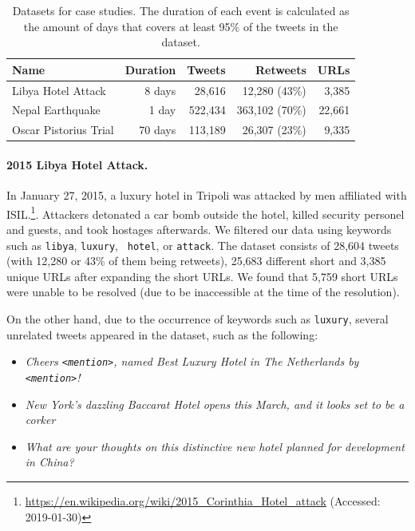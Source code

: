 \begin{table}[h]
  \centering
  \begin{tabular}{@{}lrrrr@{}}
  \toprule
  Name                  & Duration & Tweets & Retweets & URLs  \\ \midrule
  Libya Hotel Attack    & 8 days   & 28,616 & 12,280 (43\%)  & 3,385            \\
  Nepal Earthquake      & 1 day   & 522,434 & 363,102 (70\%) & 22,661          \\ 
  Oscar Pistorius Trial & 70 days  & 113,189 & 26,307 (23\%)  & 9,335           \\ \bottomrule
  \end{tabular}
  \caption[Datasets for case studies.]{Datasets for case studies. The duration of each event is calculated as the amount of days that covers at least 95\% of the tweets in the dataset.}
  \label{tab:datasets}
\end{table}


\paragraph{2015 Libya Hotel Attack.} 
%
In January 27, 2015, a luxury hotel in Tripoli was attacked by men affiliated
with
ISIL.\footnote{\url{https://en.wikipedia.org/wiki/2015_Corinthia_Hotel_attack}
(Accessed: 2019-01-30)}. 
%
Attackers detonated a car bomb outside the hotel, killed security personel and
guests, and took hostages afterwards. 
%
We filtered our data using keywords such as {\tt libya}, {\tt luxury}, {\tt
hotel}, or {\tt attack}. 
The dataset consists of 28,604 tweets (with 12,280 or 43\% of them being
retweets), 25,683 different short and 3,385 unique URLs after expanding the
short URLs. 
%
We found that 5,759 short URLs were unable to be resolved (due to be
inaccessible at the time of the resolution).

On the other hand, due to the occurrence of keywords such as {\tt luxury},
several unrelated tweets appeared in the dataset, such as the following:

\begin{itemize}
\item {\it Cheers {\tt <mention>}, named Best Luxury Hotel in The Netherlands by {\tt <mention>}!}
\item {\it New York's dazzling Baccarat Hotel opens this March, and it looks set to be a corker}
\item {\it What are your thoughts on this distinctive new hotel planned for development in China?}
\end{itemize}

